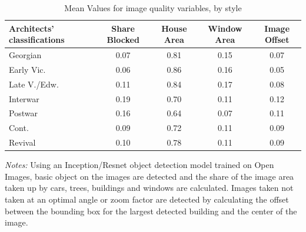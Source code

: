 \documentclass[]{article}
\begin{document}
\newpage
\clearpage

\begin{table}[ht] 
\centering 
 \caption{Mean Values for image quality variables, by style}
 
\label{tab:imgqualsumstats}
\begin{tabular}{lcccc} 
\toprule 
Architects' classifications & Share Blocked & House Area & Window Area & Image Offset \\ 
\midrule
 Georgian & 0.07 & 0.81 & 0.15 & 0.07 \\ 
 Early Vic. & 0.06 & 0.86 & 0.16 & 0.05 \\ 
 Late V./Edw. & 0.11 & 0.84 & 0.17 & 0.08 \\ 
 Interwar & 0.19 & 0.70 & 0.11 & 0.12 \\ 
 Postwar & 0.16 & 0.64 & 0.07 & 0.11 \\ 
 Cont. & 0.09 & 0.72 & 0.11 & 0.09 \\ 
 Revival & 0.10 & 0.78 & 0.11 & 0.09 \\ 
 \bottomrule
\end{tabular}
\begin{minipage}{0.9\textwidth}
\vspace{0.25cm}
\footnotesize \emph{Notes:} Using an Inception/Resnet object detection model trained on Open Images, basic object on the images are detected and the share of the image area taken up by cars, trees, buildings and windows are calculated. Images taken not taken at an optimal angle or zoom factor are detected by calculating the offset between the bounding box for the largest detected building and the center of the image.
\end{minipage}
\end{table}

\newpage
\clearpage
\end{document}
